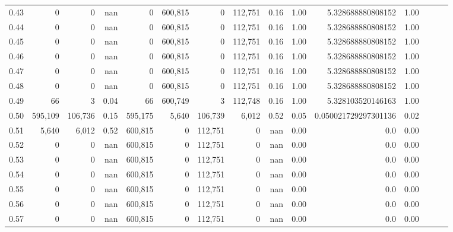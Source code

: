 \begin{tabular}{rrrrrrrrrrrrrrr}
0.43 &        0 &        0 &   nan &        0 &  600,815 &        0 &  112,751 &  0.16 &  1.00 &     5.328688880808152 &      1.00 \\
0.44 &        0 &        0 &   nan &        0 &  600,815 &        0 &  112,751 &  0.16 &  1.00 &     5.328688880808152 &      1.00 \\
0.45 &        0 &        0 &   nan &        0 &  600,815 &        0 &  112,751 &  0.16 &  1.00 &     5.328688880808152 &      1.00 \\
0.46 &        0 &        0 &   nan &        0 &  600,815 &        0 &  112,751 &  0.16 &  1.00 &     5.328688880808152 &      1.00 \\
0.47 &        0 &        0 &   nan &        0 &  600,815 &        0 &  112,751 &  0.16 &  1.00 &     5.328688880808152 &      1.00 \\
0.48 &        0 &        0 &   nan &        0 &  600,815 &        0 &  112,751 &  0.16 &  1.00 &     5.328688880808152 &      1.00 \\
0.49 &       66 &        3 &  0.04 &       66 &  600,749 &        3 &  112,748 &  0.16 &  1.00 &     5.328103520146163 &      1.00 \\
0.50 &  595,109 &  106,736 &  0.15 &  595,175 &    5,640 &  106,739 &    6,012 &  0.52 &  0.05 &  0.050021729297301136 &      0.02 \\
0.51 &    5,640 &    6,012 &  0.52 &  600,815 &        0 &  112,751 &        0 &   nan &  0.00 &                   0.0 &      0.00 \\
0.52 &        0 &        0 &   nan &  600,815 &        0 &  112,751 &        0 &   nan &  0.00 &                   0.0 &      0.00 \\
0.53 &        0 &        0 &   nan &  600,815 &        0 &  112,751 &        0 &   nan &  0.00 &                   0.0 &      0.00 \\
0.54 &        0 &        0 &   nan &  600,815 &        0 &  112,751 &        0 &   nan &  0.00 &                   0.0 &      0.00 \\
0.55 &        0 &        0 &   nan &  600,815 &        0 &  112,751 &        0 &   nan &  0.00 &                   0.0 &      0.00 \\
0.56 &        0 &        0 &   nan &  600,815 &        0 &  112,751 &        0 &   nan &  0.00 &                   0.0 &      0.00 \\
0.57 &        0 &        0 &   nan &  600,815 &        0 &  112,751 &        0 &   nan &  0.00 &                   0.0 &      0.00 \\

\end{tabular}
